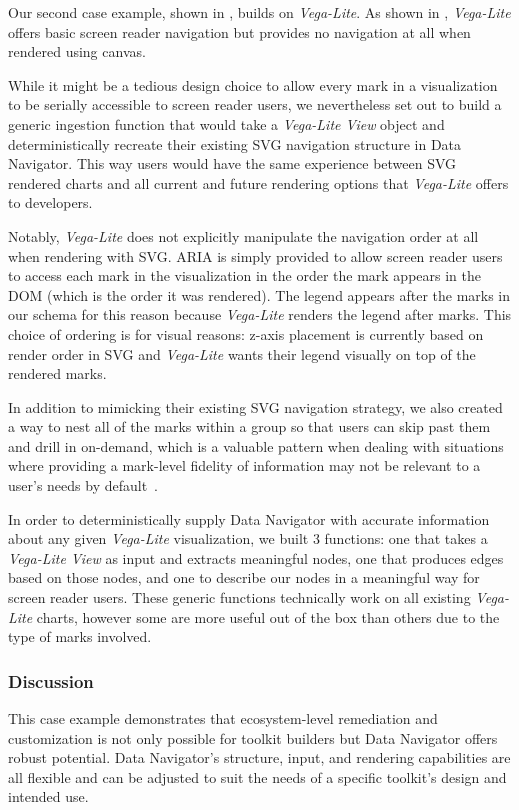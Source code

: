 \documentclass[12pt]{cmuthesis}
\begin{document}
Our second case example, shown in , builds on \textit{Vega-Lite}. As shown in , \textit{Vega-Lite} offers basic screen reader navigation but provides no navigation at all when rendered using canvas.

While it might be a tedious design choice to allow every mark in a visualization to be serially accessible to screen reader users, we nevertheless set out to build a generic ingestion function that would take a \textit{Vega-Lite View} object and deterministically recreate their existing SVG navigation structure in Data Navigator. This way users would have the same experience between SVG rendered charts and all current and future rendering options that \textit{Vega-Lite} offers to developers. 

Notably, \textit{Vega-Lite} does not explicitly manipulate the navigation order at all when rendering with SVG. ARIA is simply provided to allow screen reader users to access each mark in the visualization in the order the mark appears in the DOM (which is the order it was rendered). The legend appears after the marks in our schema for this reason because \textit{Vega-Lite} renders the legend after marks. This choice of ordering is for visual reasons: z-axis placement is currently based on render order in SVG and \textit{Vega-Lite} wants their legend visually on top of the rendered marks.

In addition to mimicking their existing SVG navigation strategy, we also created a way to nest all of the marks within a group so that users can skip past them and drill in on-demand, which is a valuable pattern when dealing with situations where providing a mark-level fidelity of information may not be relevant to a user's needs by default~\cite{Shneiderman2003Eyes,Zong2022Rich}.

In order to deterministically supply Data Navigator with accurate information about any given \textit{Vega-Lite} visualization, we built 3 functions: one that takes a \textit{Vega-Lite View} as input and extracts meaningful nodes, one that produces edges based on those nodes, and one to describe our nodes in a meaningful way for screen reader users. These generic functions technically work on all existing \textit{Vega-Lite} charts, however some are more useful out of the box than others due to the type of marks involved.

\subsubsection{Discussion}
This case example demonstrates that ecosystem-level remediation and customization is not only possible for toolkit builders but Data Navigator offers robust potential. Data Navigator's structure, input, and rendering capabilities are all flexible and can be adjusted to suit the needs of a specific toolkit's design  and intended use.
\end{document}
